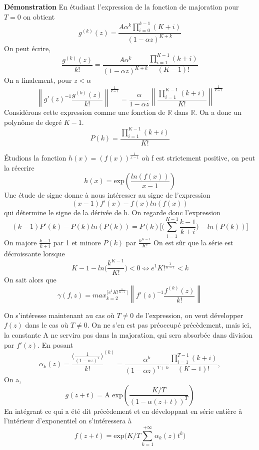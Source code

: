 \documentclass[a4paper,10.5pt]{article}
\begin{document}
	\noindent\textbf{Démonstration}
	\noindent En étudiant l'expression de la fonction de majoration pour $T=0$ on obtient
	\[g^{(k)}(z)=\frac{A\alpha^{k}\prod_{i=0}^{k-1}(K+i)}{(1-\alpha z)^{K+k}}\]
	On peut écrire,
	\[\frac{g^{(k)}(z)}{k!}=\frac{A\alpha^{k}}{(1-\alpha z)^{K+k}} \frac{\prod_{i=1}^{K-1}(k+i)}{(K-1)!} \]
	On a finalement, pour $z < \alpha$
	\[\left\|g'(z)^{-1}\frac{g^{(k)}(z)}{k!}\right\|^{\frac{1}{k-1}}= \frac{\alpha}{1-\alpha z} \left\|\frac{\prod_{i=1}^{K-1}(k+i)}{K!}\right\|^{\frac{1}{k-1}} \tag{*}\]
	Considérons cette expression comme une fonction de $\mathbb{R}$ dans $\mathbb{R}$. On a donc un polynôme de degré $K-1$.
	\[P(k)=\frac{\prod_{i=1}^{K-1}(k+i)}{K!}\]
	
	
	\noindent Étudions la fonction $h(x)=(f(x))^{\frac{1}{x-1}}$ où f est strictement positive, on peut la réecrire
	\[h(x)=\text{exp}(\frac{ln(f(x))}{x-1}) \]
	Une étude de signe donne à nous intéresser au signe de l'expression
	\[(x-1)f'(x)-f(x)ln(f(x)) \tag{1}\] 
	qui détermine le signe de la dérivée de h. On regarde donc l'expression 
	\[(k-1)P'(k)-P(k)ln(P(k))=P(k)\Big[\big(\sum_{i=1}^{K-1}\frac{k-1}{k+i}\big)-ln(P(k))\Big]\]
	On majore $\frac{k-1}{k+i}$ par 1 et minore $P(k)$ par $\frac{k^{K-1}}{K!}$ On est sûr que la série est décroissante lorsque 
	\[K-1-ln\big(\frac{k^{K-1}}{K!}\big)<0 \Longleftrightarrow e^{1}K!^{\frac{1}{K-1}}< k\]
	On sait alors que 
	\[\gamma(f,z)=max_{k=2}^{\lceil e^{1}K!^{\frac{1}{K-1}} \rceil}\left\|f'(z)^{-1}\frac{f^{(k)}(z)}{k!}\right\| \]
	
	\vspace{1cm} 
	
	On s'intéresse maintenant au cas où $T\neq 0$ de l'expression, on veut développer $f(z)$ dans le cas où $T \neq 0$. On ne s'en est pas préoccupé précèdement, mais ici, la constante A ne servira pas dans la majoration, qui sera absorbée dans division par $f'(z)$. En posant \[\alpha_{k}(z)=\frac{\big(\frac{1}{(1-\alpha z)^{T}}\big)}{k!}^{(k)}=\frac{\alpha^{k}}{(1-\alpha z)^{T+k}} \frac{\prod_{i=1}^{T-1}(k+i)}{(K-1)!},\] On a,
	\[g(z+t)=\text{A exp}(\frac{K/T}{(1-\alpha (z+t))^{T}})\]
	En intégrant ce qui a été dit précèdement et en développant en série entière à l'intérieur d'exponentiel on s'intéressera à
	\[f(z+t)=\text{exp}\Big(K/T \sum_{k=1}^{+\infty}\alpha_{k}(z)t^{k} \Big)\]
	
\end{document}
